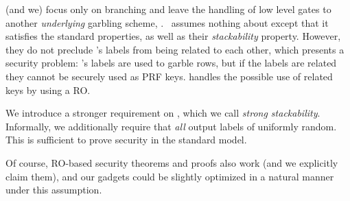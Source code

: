 
\HK (and we)
focus only on branching and leave the handling of low level gates to
another \emph{underlying} garbling scheme, \underscheme.
\HK\ assumes nothing about \underscheme except that it satisfies the standard
\cite{CCS:BelHoaRog12} properties, as well as their {\em stackability} property.
However, they do not preclude \underscheme's
labels from being related to each other, which presents a security
problem:
\underscheme's labels are used to garble rows, but if the labels are
related they cannot be securely used as PRF keys.
\HK handles the possible use of related keys by using
a RO.

We introduce a stronger requirement on \underscheme, which we call
{\em strong stackability}.  Informally, we additionally require that
{\em all} output labels of \underscheme
uniformly random.  This is sufficient to prove security in the standard model.

Of course, RO-based security theorems and proofs also work (and we explicitly claim them), and our gadgets could be slightly optimized in a natural manner under this assumption.






